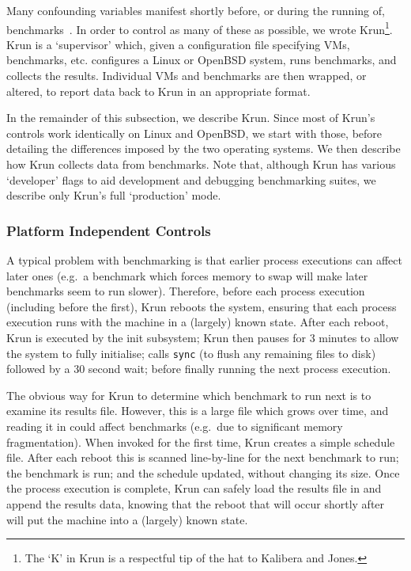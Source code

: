 \documentclass[acmsmall]{acmart}\settopmatter{printfolios=true}
\newcommand{\kalibera}{Kalibera and Jones\xspace}
\newcommand{\krun}{Krun\xspace}
\begin{document}
Many confounding variables manifest shortly before, or during the running of,
benchmarks~\cite{kalibera05precision}. In order to control as many of these as possible, we wrote
\krun\footnote{The `K' in Krun is a respectful tip of the hat to \kalibera.}.
\krun is a `supervisor'
which, given a configuration file specifying VMs, benchmarks, etc. configures
a Linux or OpenBSD system, runs benchmarks, and collects the results. Individual VMs and benchmarks
are then wrapped, or altered, to report data back to \krun in an appropriate format.

In the remainder of this subsection, we describe \krun. Since most of \krun's
controls work identically on Linux and OpenBSD, we start with those,
before detailing the differences imposed by the two operating systems. We then
describe how \krun collects data from benchmarks.
Note that, although \krun has various `developer' flags to aid development
and debugging benchmarking suites, we describe only \krun's full `production' mode.


\subsubsection{Platform Independent Controls}

A typical problem with benchmarking is that earlier process executions can
affect later ones (e.g.~a benchmark which forces memory to swap will make
later benchmarks seem to run slower). Therefore, before each process execution
(including before the first), \krun reboots the system, ensuring that each
process execution runs with the machine in a (largely) known state. After each reboot, \krun is
executed by the init subsystem; \krun then pauses for 3
minutes to allow the system to fully initialise; calls \texttt{sync} (to
flush any remaining files to disk) followed by a 30 second wait; before finally running the
next process execution.

The obvious way for \krun to determine which benchmark to run next is to examine
its results file. However, this is a large file which grows over time, and
reading it in could affect benchmarks (e.g.~due to significant memory
fragmentation). When invoked for the first time, \krun
creates a simple schedule file. After each reboot this is scanned
line-by-line for the next benchmark to run; the benchmark is run; and the schedule
updated, without changing its size. Once the process execution is
complete, \krun can safely load the results file in and append the results data,
knowing that the reboot that will occur shortly after will put the machine into
a (largely) known state.
\end{document}
